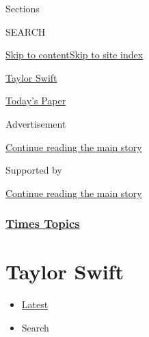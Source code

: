 Sections

SEARCH

\protect\hyperlink{site-content}{Skip to
content}\protect\hyperlink{site-index}{Skip to site index}

\href{https://www.nytimes3xbfgragh.onion/topic/person/taylor-swift}{Taylor
Swift}

\href{https://myaccount.nytimes3xbfgragh.onion/auth/login?response_type=cookie\&client_id=vi}{}

\href{https://www.nytimes3xbfgragh.onion/section/todayspaper}{Today's
Paper}

Advertisement

\protect\hyperlink{after-top}{Continue reading the main story}

Supported by

\protect\hyperlink{after-sponsor}{Continue reading the main story}

\hypertarget{times-topics}{%
\subsubsection{\texorpdfstring{\href{/index.html}{Times
Topics}}{Times Topics}}\label{times-topics}}

\hypertarget{taylor-swift}{%
\section{Taylor Swift}\label{taylor-swift}}

\begin{itemize}
\tightlist
\item
  \protect\hyperlink{stream-panel}{Latest}
\item
  Search
\end{itemize}

